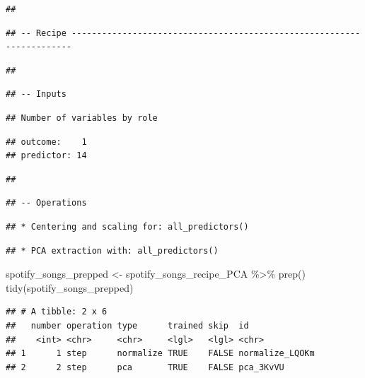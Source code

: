 \documentclass[
]{article}
\newenvironment{Shaded}{\begin{snugshade}}{\end{snugshade}}
\newcommand{\FunctionTok}[1]{\textcolor[rgb]{0.00,0.00,0.00}{#1}}
\newcommand{\NormalTok}[1]{#1}
\newcommand{\OtherTok}[1]{\textcolor[rgb]{0.56,0.35,0.01}{#1}}
\newcommand{\SpecialCharTok}[1]{\textcolor[rgb]{0.00,0.00,0.00}{#1}}
\begin{document}
\begin{verbatim}
## 
\end{verbatim}

\begin{verbatim}
## -- Recipe ----------------------------------------------------------------------
\end{verbatim}

\begin{verbatim}
## 
\end{verbatim}

\begin{verbatim}
## -- Inputs
\end{verbatim}

\begin{verbatim}
## Number of variables by role
\end{verbatim}

\begin{verbatim}
## outcome:    1
## predictor: 14
\end{verbatim}

\begin{verbatim}
## 
\end{verbatim}

\begin{verbatim}
## -- Operations
\end{verbatim}

\begin{verbatim}
## * Centering and scaling for: all_predictors()
\end{verbatim}

\begin{verbatim}
## * PCA extraction with: all_predictors()
\end{verbatim}

\begin{Shaded}
\begin{Highlighting}[]
\NormalTok{spotify\_songs\_prepped }\OtherTok{\textless{}{-}}\NormalTok{ spotify\_songs\_recipe\_PCA }\SpecialCharTok{\%\textgreater{}\%} \FunctionTok{prep}\NormalTok{() }
\FunctionTok{tidy}\NormalTok{(spotify\_songs\_prepped)}
\end{Highlighting}
\end{Shaded}

\begin{verbatim}
## # A tibble: 2 x 6
##   number operation type      trained skip  id             
##    <int> <chr>     <chr>     <lgl>   <lgl> <chr>          
## 1      1 step      normalize TRUE    FALSE normalize_LQOKm
## 2      2 step      pca       TRUE    FALSE pca_3KvVU
\end{verbatim}
\end{document}

